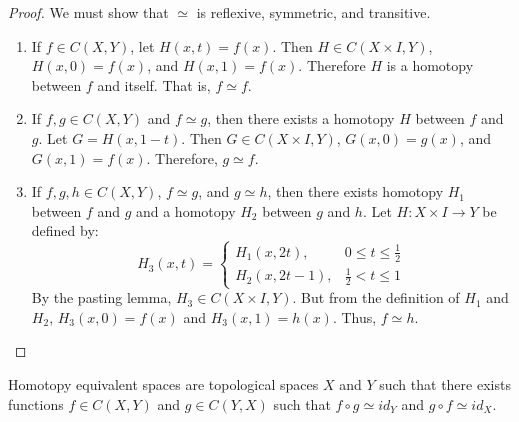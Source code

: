 \documentclass[crop=false,class=book,oneside]{standalone}
\begin{document}
            \begin{proof}
                We must show that $\simeq$ is reflexive,
                symmetric, and transitive.
                \begin{enumerate}
                    \item If ${f}\in{C(X,Y)}$,
                        let $H(x,t)=f(x)$. Then
                        $H\in{C({X}\times{I},Y)}$, $H(x,0)=f(x)$,
                        and $H(x,1)=f(x)$.
                        Therefore $H$ is a homotopy between $f$ and
                        itself. That is, $f\simeq f$.
                    \item If ${f,g}\in{C(X,Y)}$ and ${f}\simeq{g}$,
                        then there exists a homotopy $H$
                        between $f$ and $g$.
                        Let $G=H(x,1-t)$. Then
                        $G\in{C({X}\times{I},Y)}$,
                        $G(x,0)=g(x)$, and $G(x,1)=f(x)$.
                        Therefore, ${g}\simeq{f}$.
                    \item If ${f,g,h}\in{C(X,Y)}$, ${f}\simeq{g}$,
                        and ${g}\simeq{h}$, then there exists
                        homotopy $H_{1}$ between $f$ and $g$ and
                        a homotopy $H_{2}$ between $g$ and $h$.
                        Let $H:{X}\times{I}\rightarrow{Y}$
                        be defined by:
                        \begin{equation*}
                            H_{3}(x,t)=
                            \begin{cases}
                                H_{1}(x,2t),
                                &{0}\leq{t}\leq\frac{1}{2}\\
                                H_{2}(x,2t-1),
                                &\frac{1}{2}<{t}\leq{1}
                            \end{cases}
                        \end{equation*}
                        By the pasting lemma, 
                        $H_{3}\in{C({X}\times{I},Y)}$.
                        But from the definition
                        of $H_{1}$ and $H_{2}$,
                        $H_{3}(x,0)=f(x)$ and
                        $H_{3}(x,1)=h(x)$.
                        Thus, $f\simeq{h}$.
                \end{enumerate}
            \end{proof}
            \begin{definition}
                Homotopy equivalent spaces are topological
                spaces $X$ and $Y$ such that there exists functions
                ${f}\in{C(X,Y)}$ and ${g}\in{C(Y,X)}$
                such that
                ${f}\circ{g}\simeq{id_{Y}}$
                and ${g}\circ{f}\simeq{id_{X}}$.
            \end{definition}
\end{document}
